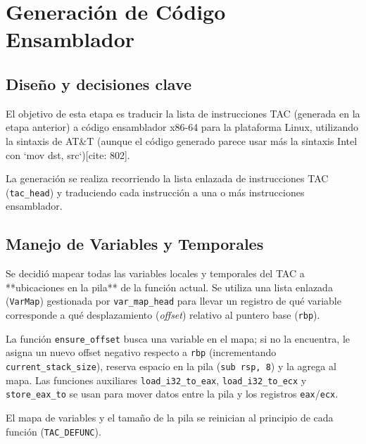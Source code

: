 \documentclass[12pt,a4paper]{article}
\begin{document}
\section{Generación de Código Ensamblador}

\subsection{Diseño y decisiones clave}
El objetivo de esta etapa es traducir la lista de instrucciones TAC (generada en la etapa anterior) a código ensamblador x86-64 para la plataforma Linux, utilizando la sintaxis de AT&T (aunque el código generado parece usar más la sintaxis Intel con `mov dst, src`)[cite: 802].

La generación se realiza recorriendo la lista enlazada de instrucciones TAC (\texttt{tac\_head}) y traduciendo cada instrucción a una o más instrucciones ensamblador.

\subsection{Manejo de Variables y Temporales}
Se decidió mapear todas las variables locales y temporales del TAC a **ubicaciones en la pila** de la función actual. Se utiliza una lista enlazada (\texttt{VarMap}) gestionada por \texttt{var\_map\_head} para llevar un registro de qué variable corresponde a qué desplazamiento (\textit{offset}) relativo al puntero base (\texttt{rbp}).

La función \texttt{ensure\_offset} busca una variable en el mapa; si no la encuentra, le asigna un nuevo offset negativo respecto a \texttt{rbp} (incrementando \texttt{current\_stack\_size}), reserva espacio en la pila (\texttt{sub rsp, 8}) y la agrega al mapa. Las funciones auxiliares \texttt{load\_i32\_to\_eax}, \texttt{load\_i32\_to\_ecx} y \texttt{store\_eax\_to} se usan para mover datos entre la pila y los registros \texttt{eax}/\texttt{ecx}.

El mapa de variables y el tamaño de la pila se reinician al principio de cada función (\texttt{TAC\_DEFUNC}).
\end{document}

